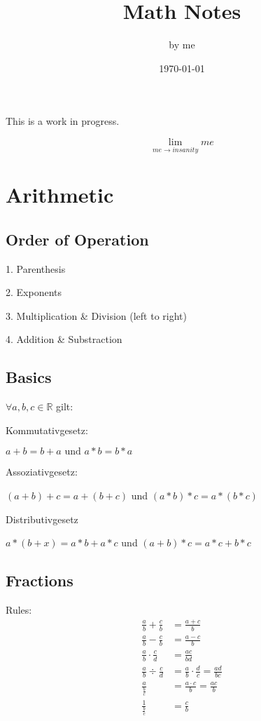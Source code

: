 \documentclass{article}
\title{Math Notes}
\author{by me}
\date{\today}
\begin{document}
\maketitle

This is a work in progress.

$$\lim_{me \rightarrow insanity} me$$

\tableofcontents

\section{Arithmetic}
\subsection*{Order of Operation}
1. Parenthesis

2. Exponents

3. Multiplication \& Division (left to right)

4. Addition \& Substraction

\subsection{Basics}
$\forall a,b,c \in \mathbb{R} $ gilt:

Kommutativgesetz:

$a+b = b+a \text{ und } a*b=b*a$

Assoziativgesetz:

$(a+b)+c = a+(b+c)$ und $(a*b)*c=a*(b*c)$
 
Distributivgesetz

$a*(b+x) = a*b+a*c$ und $(a+b)*c = a*c + b*c$

\subsection{Fractions}
Rules:
\begin{align*}
    \frac{a}{b} + \frac{c}{b} &= \frac{a+c}{b} \\
    \frac{a}{b} - \frac{c}{b} &= \frac{a-c}{b} \\
    \frac{a}{b} \cdot \frac{c}{d} &= \frac{ac}{bd} \\
    \frac{a}{b} \div \frac{c}{d} &= \frac{a}{b} \cdot \frac{d}{c} = \frac{ad}{bc} \\
    \frac{a}{\frac{b}{c}} &= \frac{a \cdot c}{b} = \frac{ac}{b} \\
    \frac{1}{\frac{b}{c}} &= \frac{c}{b}
\end{align*}
\end{document}
